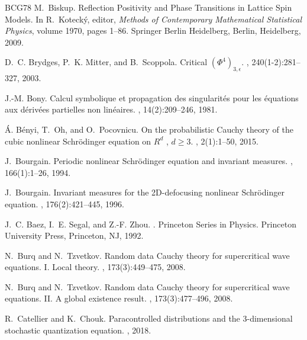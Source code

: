 \documentclass[a4paper,11pt]{article}
\numberwithin{equation}{section}
\begin{document}
\begin{thebibliography}{BCG{\etalchar{+}}78}
M.~Biskup.
\newblock Reflection {Positivity} and {Phase} {Transitions} in {Lattice} {Spin}
  {Models}.
\newblock In R.~Koteck\'y, editor, {\em Methods of {Contemporary}
  {Mathematical} {Statistical} {Physics}}, volume 1970, pages 1--86. Springer
  Berlin Heidelberg, Berlin, Heidelberg, 2009.

D.~C. Brydges, P.~K. Mitter, and B.~Scoppola.
\newblock Critical {$(\Phi^4)_{3,\epsilon}$}.
, 240(1-2):281--327, 2003.

J.-M. Bony.
\newblock Calcul symbolique et propagation des singularit\'es pour les
  \'equations aux d\'eriv\'ees partielles non lin\'eaires.
,
  14(2):209--246, 1981.

\'A. B\'enyi, T.~Oh, and O.~Pocovnicu.
\newblock On the probabilistic {Cauchy} theory of the cubic nonlinear
  {Schr\"odinger} equation on {$R^d$} , $d\ge 3$.
,
  2(1):1--50, 2015.

J.~Bourgain.
\newblock Periodic nonlinear {Schr\"odinger} equation and invariant measures.
, 166(1):1--26, 1994.

J.~Bourgain.
\newblock Invariant measures for the {2D-}defocusing nonlinear {Schr\"odinger}
  equation.
, 176(2):421--445, 1996.

J.~C. Baez, I.~E. Segal, and Z.-F. Zhou.
.
\newblock Princeton {Series} in {Physics}. Princeton University Press,
  Princeton, NJ, 1992.

N.~Burq and N.~Tzvetkov.
\newblock Random data {Cauchy} theory for supercritical wave equations. {I}.
  {Local} theory.
, 173(3):449--475, 2008.

N.~Burq and N.~Tzvetkov.
\newblock Random data {Cauchy} theory for supercritical wave equations. {II}.
  {A} global existence result.
, 173(3):477--496, 2008.

R.~Catellier and K.~Chouk.
\newblock Paracontrolled distributions and the 3-dimensional stochastic
  quantization equation.
, 2018.


\end{thebibliography}
\end{document}
